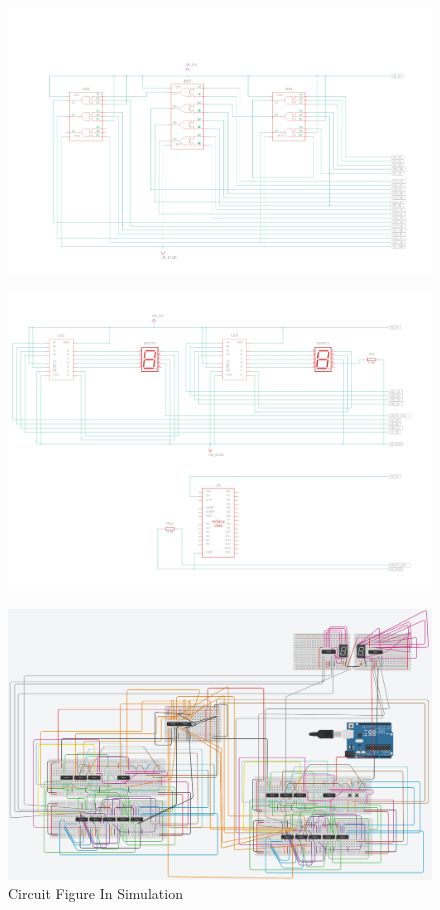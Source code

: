 \documentclass[a4paper,12pt]{article}
\begin{document}
\begin{figure}[H]
\centering    
\includegraphics[width=1\textwidth]{figs/c7.png}
\caption{}
\end{figure}
\begin{figure}[H]
\centering    
\includegraphics[width=1\textwidth]{figs/c8.png}
\caption{} 
\end{figure}
\begin{figure}[H]
\centering    
\includegraphics[width=1\textwidth]{figs/Circuit.png}
	\caption*{Circuit Figure In Simulation}
\end{figure}
\end{document}
